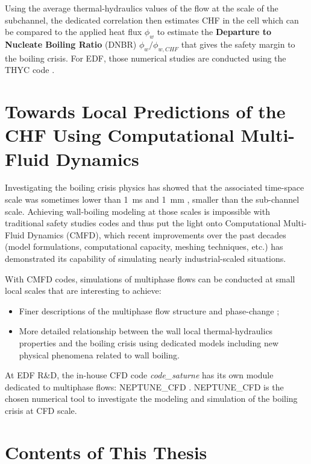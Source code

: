 \npar

Using the average thermal-hydraulics values of the flow at the scale of the subchannel, the dedicated correlation then estimates CHF in the cell which can be compared to the applied heat flux $\phi_{w}$ to estimate the \textbf{Departure to Nucleate Boiling Ratio} (DNBR) $\phi_{w} / \phi_{w,CHF}$ that gives the safety margin to the boiling crisis. For EDF, those numerical studies are conducted using the THYC code \cite{aubry_thyc_1995}.

\section{Towards Local Predictions of the CHF Using Computational Multi-Fluid Dynamics}

Investigating the boiling crisis physics has showed that the associated time-space scale was sometimes lower than 1\ ms and 1\ mm \cite{bloch_study_2016}, \ie smaller than the sub-channel scale. Achieving wall-boiling modeling at those scales is impossible with traditional safety studies codes and thus put the light onto Computational Multi-Fluid Dynamics (CMFD), which recent improvements over the past decades (model formulations, computational capacity, meshing techniques, etc.) has demonstrated its capability of simulating nearly industrial-scaled situations.

\npar

With CMFD codes, simulations of multiphase flows can be conducted at small local scales that are interesting to achieve:
\begin{itemize}
\item Finer descriptions of the multiphase flow structure and phase-change ;\
\item More detailed relationship between the wall local thermal-hydraulics properties and the boiling crisis using dedicated models including new physical phenomena related to wall boiling.
\end{itemize} 

At EDF R\&D, the in-house CFD code \textit{code\_saturne} has its own module dedicated to multiphase flows: NEPTUNE\_CFD \cite{guelfi_neptune_2007}. NEPTUNE\_CFD is the chosen numerical tool to investigate the modeling and simulation of the boiling crisis at CFD scale.


\section{Contents of This Thesis}

